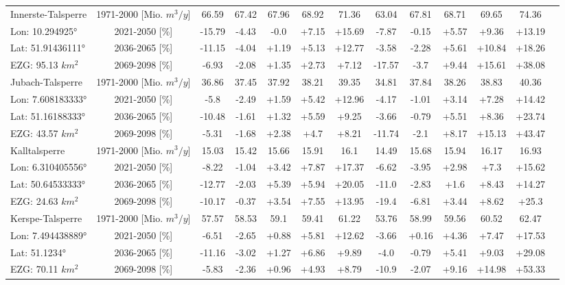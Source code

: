 \begin{longtable}{@{\extracolsep{\fill}}lc|ccccc||cccccc}
Innerste-Talsperre & 1971-2000 [Mio. $m^3/y$]  & 66.59 & 67.42 & 67.96 & 68.92 & 71.36 & 63.04 & 67.81 & 68.71 & 69.65 & 74.36 & \\ 
\cline{2-13} 
Lon: 10.294925° & 2021-2050 [\%]  & -15.79 & -4.43 & -0.0 & +7.15 & +15.69 & -7.87 & -0.15 & +5.57 & +9.36 & +13.19 & \\ 
Lat: 51.91436111° & 2036-2065 [\%]  & -11.15 & -4.04 & +1.19 & +5.13 & +12.77 & -3.58 & -2.28 & +5.61 & +10.84 & +18.26 & \\ 
EZG: 95.13 $km^2$ & 2069-2098 [\%]  & -6.93 & -2.08 & +1.35 & +2.73 & +7.12 & -17.57 & -3.7 & +9.44 & +15.61 & +38.08 & \\ 
\hline 
Jubach-Talsperre & 1971-2000 [Mio. $m^3/y$]  & 36.86 & 37.45 & 37.92 & 38.21 & 39.35 & 34.81 & 37.84 & 38.26 & 38.83 & 40.36 & \\ 
\cline{2-13} 
Lon: 7.608183333° & 2021-2050 [\%]  & -5.8 & -2.49 & +1.59 & +5.42 & +12.96 & -4.17 & -1.01 & +3.14 & +7.28 & +14.42 & \\ 
Lat: 51.16188333° & 2036-2065 [\%]  & -10.48 & -1.61 & +1.32 & +5.59 & +9.25 & -3.66 & -0.79 & +5.51 & +8.36 & +23.74 & \\ 
EZG: 43.57 $km^2$ & 2069-2098 [\%]  & -5.31 & -1.68 & +2.38 & +4.7 & +8.21 & -11.74 & -2.1 & +8.17 & +15.13 & +43.47 & \\ 
\hline 
Kalltalsperre & 1971-2000 [Mio. $m^3/y$]  & 15.03 & 15.42 & 15.66 & 15.91 & 16.1 & 14.49 & 15.68 & 15.94 & 16.17 & 16.93 & \\ 
\cline{2-13} 
Lon: 6.310405556° & 2021-2050 [\%]  & -8.22 & -1.04 & +3.42 & +7.87 & +17.37 & -6.62 & -3.95 & +2.98 & +7.3 & +15.62 & \\ 
Lat: 50.64533333° & 2036-2065 [\%]  & -12.77 & -2.03 & +5.39 & +5.94 & +20.05 & -11.0 & -2.83 & +1.6 & +8.43 & +14.27 & \\ 
EZG: 24.63 $km^2$ & 2069-2098 [\%]  & -10.17 & -0.37 & +3.54 & +7.55 & +13.95 & -19.4 & -6.81 & +3.44 & +8.62 & +25.3 & \\ 
\hline 
Kerspe-Talsperre & 1971-2000 [Mio. $m^3/y$]  & 57.57 & 58.53 & 59.1 & 59.41 & 61.22 & 53.76 & 58.99 & 59.56 & 60.52 & 62.47 & \\ 
\cline{2-13} 
Lon: 7.494438889° & 2021-2050 [\%]  & -6.51 & -2.65 & +0.88 & +5.81 & +12.62 & -3.66 & +0.16 & +4.36 & +7.47 & +17.53 & \\ 
Lat: 51.1234° & 2036-2065 [\%]  & -11.16 & -3.02 & +1.27 & +6.86 & +9.89 & -4.0 & -0.79 & +5.41 & +9.03 & +29.08 & \\ 
EZG: 70.11 $km^2$ & 2069-2098 [\%]  & -5.83 & -2.36 & +0.96 & +4.93 & +8.79 & -10.9 & -2.07 & +9.16 & +14.98 & +53.33 & \\ 

\end{longtable}
